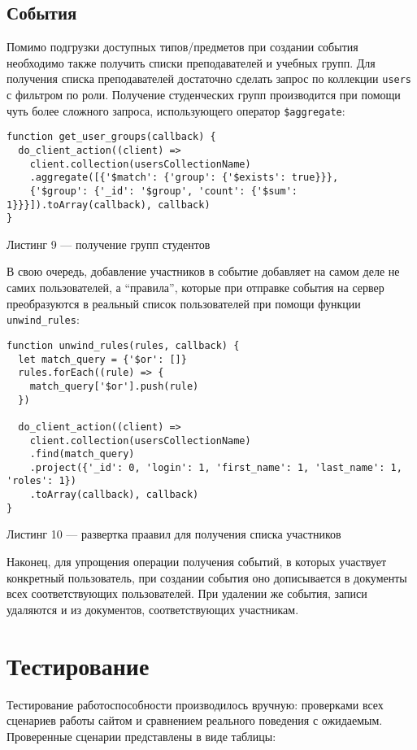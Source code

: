 \documentclass[14pt]{extarticle}
\begin{document}
\subsection{События}
Помимо подгрузки доступных типов/предметов при создании события необходимо также получить списки преподавателей и учебных групп. Для получения списка преподавателей достаточно сделать запрос по коллекции \texttt{users} с фильтром по роли. Получение студенческих групп производится при помощи чуть более сложного запроса, использующего оператор \texttt{\$aggregate}:
\begin{lstlisting}
function get_user_groups(callback) {
  do_client_action((client) =>
    client.collection(usersCollectionName)
    .aggregate([{'$match': {'group': {'$exists': true}}},
    {'$group': {'_id': '$group', 'count': {'$sum': 1}}}]).toArray(callback), callback)
}

\end{lstlisting}
\begin{center}
Листинг 9 --- получение групп студентов
\end{center}

В свою очередь, добавление участников в событие добавляет на самом деле не самих пользователей, а \enquote{правила}, которые при отправке события на сервер преобразуются в реальный список пользователей при помощи функции \texttt{unwind\_rules}:
\begin{lstlisting}
function unwind_rules(rules, callback) {
  let match_query = {'$or': []}
  rules.forEach((rule) => {
    match_query['$or'].push(rule)
  })

  do_client_action((client) =>
    client.collection(usersCollectionName)
    .find(match_query)
    .project({'_id': 0, 'login': 1, 'first_name': 1, 'last_name': 1, 'roles': 1})
    .toArray(callback), callback)
}
\end{lstlisting}
\begin{center}
Листинг 10 --- развертка праавил для получения списка участников
\end{center}

Наконец, для упрощения операции получения событий, в которых участвует конкретный пользователь, при создании события оно дописывается в документы всех соответствующих пользователей. При удалении же события, записи удаляются и из документов, соответствующих участникам.

\newpage
\section{Тестирование}
Тестирование работоспособности производилось вручную: проверками всех сценариев работы сайтом и сравнением реального поведения с ожидаемым. Проверенные сценарии представлены в виде таблицы:
\end{document}
